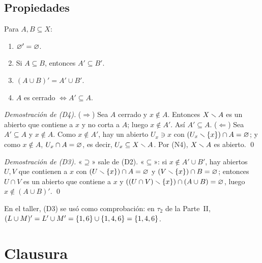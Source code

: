 \subsection{Propiedades}
\begin{teorema}
Para $A,B\subseteq X$:
\begin{enumerate}[label=(D\arabic*),leftmargin=2.6em]
\item $\varnothing'=\varnothing$.
\item Si $A\subseteq B$, entonces $A'\subseteq B'$.
\item $(A\cup B)'=A'\cup B'$.
\item $A$ es cerrado $\iff A'\subseteq A$.
\end{enumerate}
\end{teorema}
\emph{Demostración de (D4).} ($\Rightarrow$) Sea $A$ cerrado y $x\notin A$. Entonces $X\smallsetminus A$ es un abierto que
contiene a $x$ y no corta a $A$; luego $x\notin A'$. Así $A'\subseteq A$. ($\Leftarrow$) Sea $A'\subseteq A$ y
$x\notin A$. Como $x\notin A'$, hay un abierto $U_x\ni x$ con $(U_x\smallsetminus\{x\})\cap A=\varnothing$; y como $x\notin A$,
$U_x\cap A=\varnothing$, es decir, $U_x\subseteq X\smallsetminus A$. Por (N4), $X\smallsetminus A$ es abierto. \qed

\emph{Demostración de (D3).} «$\supseteq$» sale de (D2). «$\subseteq$»: si $x\notin A'\cup B'$, hay abiertos $U,V$ que
contienen a $x$ con $(U\smallsetminus\{x\})\cap A=\varnothing$ y $(V\smallsetminus\{x\})\cap B=\varnothing$; entonces $U\cap V$ es un abierto que contiene a
$x$ y $((U\cap V)\smallsetminus\{x\})\cap(A\cup B)=\varnothing$, luego $x\notin(A\cup B)'$. \qed

En el taller, (D3) se usó como comprobación: en $\tau_2$ de la Parte~II, $(L\cup M)'=L'\cup M'=\{1,6\}\cup\{1,4,6\}=\{1,4,6\}$.

\section{Clausura}
